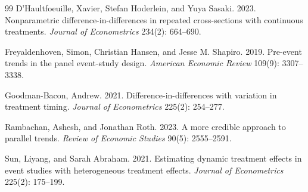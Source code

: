 \documentclass[11pt]{article}
\theoremstyle{definition}
\theoremstyle{plain}
\theoremstyle{remark}
\begin{document}
\begin{thebibliography}{99}
D'Haultfoeuille, Xavier, Stefan Hoderlein, and Yuya Sasaki. 2023.
Nonparametric difference-in-differences in repeated cross-sections with continuous treatments.
\emph{Journal of Econometrics} 234(2): 664--690.

Freyaldenhoven, Simon, Christian Hansen, and Jesse M. Shapiro. 2019.
Pre-event trends in the panel event-study design.
\emph{American Economic Review} 109(9): 3307--3338.

Goodman-Bacon, Andrew. 2021.
Difference-in-differences with variation in treatment timing.
\emph{Journal of Econometrics} 225(2): 254--277.

Rambachan, Ashesh, and Jonathan Roth. 2023.
A more credible approach to parallel trends.
\emph{Review of Economic Studies} 90(5): 2555--2591.

Sun, Liyang, and Sarah Abraham. 2021.
Estimating dynamic treatment effects in event studies with heterogeneous treatment effects.
\emph{Journal of Econometrics} 225(2): 175--199.
\end{thebibliography}
\end{document}
